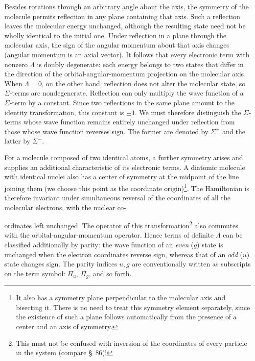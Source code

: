 Besides rotations through an arbitrary angle about the axis, the symmetry of the molecule permits reflection in any plane containing that axis. Such a reflection leaves the molecular energy unchanged, although the resulting state need not be wholly identical to the initial one. Under reflection in a plane through the molecular axis, the sign of the angular momentum about that axis changes (angular momentum is an axial vector). It follows that every electronic term with nonzero $\Lambda$ is doubly degenerate: each energy belongs to two states that differ in the direction of the orbital-angular-momentum projection on the molecular axis. When $\Lambda=0$, on the other hand, reflection does not alter the molecular state, so $\Sigma$-terms are nondegenerate. Reflection can only multiply the wave function of a $\Sigma$-term by a constant. Since two reflections in the same plane amount to the identity transformation, this constant is $\pm1$. We must therefore distinguish the $\Sigma$-terms whose wave function remains entirely unchanged under reflection from those whose wave function reverses sign. The former are denoted by $\Sigma^+$ and the latter by $\Sigma^-$.

For a molecule composed of two identical atoms, a further symmetry arises and supplies an additional characteristic of its electronic terms. A diatomic molecule with identical nuclei also has a center of symmetry at the midpoint of the line joining them (we choose this point as the coordinate origin)\footnote{It also has a symmetry plane perpendicular to the molecular axis and bisecting it. There is no need to treat this symmetry element separately, since the existence of such a plane follows automatically from the presence of a center and an axis of symmetry.}. The Hamiltonian is therefore invariant under simultaneous reversal of the coordinates of all the molecular electrons, with the nuclear co-

ordinates left unchanged. The operator of this transformation\footnote{This must not be confused with inversion of the coordinates of every particle in the system (compare \S~86)!} also commutes with the orbital-angular-momentum operator. Hence terms of definite $\Lambda$ can be classified additionally by parity: the wave function of an \emph{even} ($g$) state is unchanged when the electron coordinates reverse sign, whereas that of an \emph{odd} ($u$) state changes sign. The parity indices $u,g$ are conventionally written as subscripts on the term symbol: $\Pi_u$, $\Pi_g$, and so forth.

